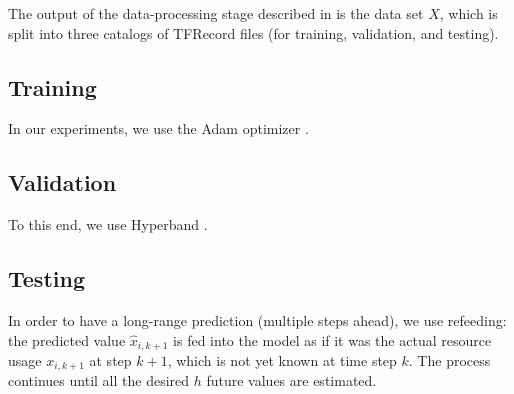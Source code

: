 
The output of the data-processing stage described in  is the data set
$X$, which is split into three catalogs of TFRecord files (for training,
validation, and testing).

\subsection{Training}
In our experiments, we use the Adam optimizer \cite{kingma2014}.

\subsection{Validation}
To this end, we use Hyperband \cite{li2016}.

\subsection{Testing}
In order to have a long-range prediction (multiple steps ahead), we use
refeeding: the predicted value $\hat{x}_{i,k + 1}$ is fed into the model as if
it was the actual resource usage $x_{i,k + 1}$ at step $k + 1$, which is not
yet known at time step $k$. The process continues until all the desired $h$
future values are estimated.
